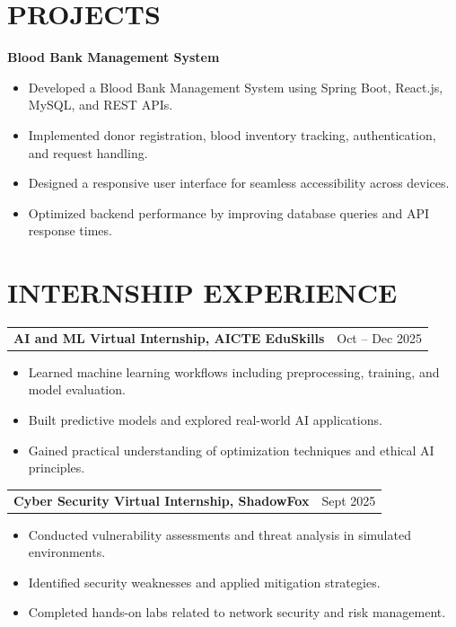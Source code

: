 \documentclass[a4paper,12pt]{article}
\begin{document}
\section*{PROJECTS}

\textbf{Blood Bank Management System}

\begin{itemize}
    \item Developed a Blood Bank Management System using Spring Boot, React.js, MySQL, and REST APIs.
    \item Implemented donor registration, blood inventory tracking, authentication, and request handling.
    \item Designed a responsive user interface for seamless accessibility across devices.
    \item Optimized backend performance by improving database queries and API response times.
\end{itemize}

\section*{INTERNSHIP EXPERIENCE}

\begin{tabularx}{\textwidth}{Xr}
\textbf{AI and ML Virtual Internship, AICTE EduSkills} & Oct -- Dec 2025 \\
\end{tabularx}

\begin{itemize}
    \item Learned machine learning workflows including preprocessing, training, and model evaluation.
    \item Built predictive models and explored real-world AI applications.
    \item Gained practical understanding of optimization techniques and ethical AI principles.
\end{itemize}

\vspace{4pt}

\begin{tabularx}{\textwidth}{Xr}
\textbf{Cyber Security Virtual Internship, ShadowFox} & Sept 2025 \\
\end{tabularx}

\begin{itemize}
    \item Conducted vulnerability assessments and threat analysis in simulated environments.
    \item Identified security weaknesses and applied mitigation strategies.
    \item Completed hands-on labs related to network security and risk management.
\end{itemize}
\end{document}
